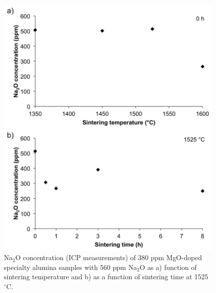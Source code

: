 \newpage
\begin{figure}[H]
	\centering
	\includegraphics[width=\textwidth]{Chapter-3/Figures/Figure12.png}
	\caption{Na$_{2}$O concentration (ICP measurements) of 380 ppm MgO-doped specialty alumina samples with 560 ppm Na$_{2}$O as a) function of sintering temperature and b) as a function of sintering time at 1525 $^{\circ}$C.}
	\label{Ch3-figure:Figure12}
\end{figure}

